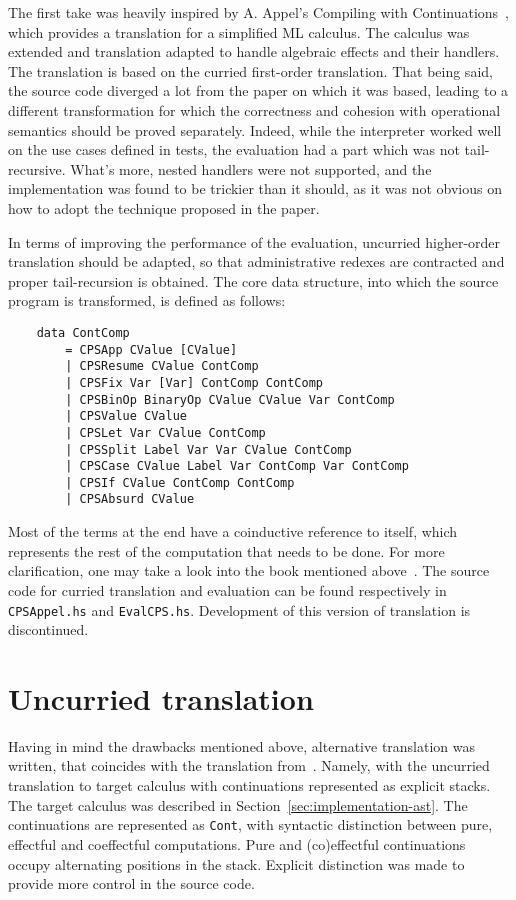 \documentclass[declaration,shortabstract]{iithesis}
\theoremstyle{definition} \newtheorem{definition}{Definition}[chapter]
\theoremstyle{remark} \newtheorem{remark}[definition]{Observation}
\theoremstyle{plain} \newtheorem{theorem}[definition]{Theorem}
\theoremstyle{plain} \newtheorem{lemma}[definition]{Lemma}
\begin{document}
    The first take was heavily inspired by A. Appel's Compiling with
    Continuations~\cite{appel-continuations}, which provides a translation for
    a simplified ML calculus. The calculus was extended and translation adapted to
    handle algebraic effects and their handlers. The translation is based on the curried
    first-order translation. That being said, the source code diverged a lot from the
    paper on which it was based, leading to a different transformation for which the
    correctness and cohesion with operational semantics should be proved separately.
    Indeed, while the interpreter worked well on the use cases defined in tests, the
    evaluation had a part which was not tail-recursive. What's more, nested handlers
    were not supported, and the implementation was found to be trickier than it should,
    as it was not obvious on how to adopt the technique proposed in the paper.

    In terms of improving the performance of the evaluation, uncurried higher-order
    translation should be adapted, so that administrative redexes are contracted
    and proper tail-recursion is obtained. The core data structure, into which the
    source program is transformed, is defined as follows:

\begin{verbatim}
    data ContComp
        = CPSApp CValue [CValue]
        | CPSResume CValue ContComp
        | CPSFix Var [Var] ContComp ContComp
        | CPSBinOp BinaryOp CValue CValue Var ContComp
        | CPSValue CValue
        | CPSLet Var CValue ContComp
        | CPSSplit Label Var Var CValue ContComp
        | CPSCase CValue Label Var ContComp Var ContComp
        | CPSIf CValue ContComp ContComp
        | CPSAbsurd CValue
\end{verbatim}
    Most of the terms at the end have a coinductive reference to itself, which
    represents the rest of the computation that needs to be done. For more
    clarification, one may take a look into the book mentioned
    above~\cite{appel-continuations}. The source code for curried translation and
    evaluation can be found respectively in \verb!CPSAppel.hs! and
    \verb!EvalCPS.hs!. Development of this version of translation is discontinued.

    \section{Uncurried translation}

    Having in mind the drawbacks mentioned above, alternative translation was
    written, that coincides with the translation from~\cite{handlers-cps-journal}.
    Namely, with the uncurried translation to target calculus with continuations
    represented as explicit stacks. The target calculus was described in
    Section~\ref{sec:implementation-ast}. The continuations are represented as
    \verb!Cont!, with syntactic distinction between pure, effectful and
    coeffectful computations. Pure and (co)effectful continuations occupy
    alternating positions in the stack. Explicit distinction was made to provide
    more control in the source code.
\end{document}
